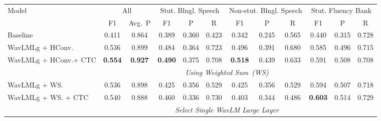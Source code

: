 \begin{table}
\centering
\begin{tabular}{lccccccccccc}
\toprule
\multirow{2}{*}{Model} & \multicolumn{2}{c}{All} &  \multicolumn{3}{c}{Stut. Blngl. Speech} & \multicolumn{3}{c}{Non-stut. Blngl. Speech} &  \multicolumn{3}{c}{Stut. Fluency Bank} \\
\cmidrule(lr){2-3}
\cmidrule(lr){4-6}
\cmidrule(lr){7-9}
\cmidrule(lr){10-12}
   & F1 & Avg.~P & 
 F1	& P & R & 
 F1	& P & R & 
 F1	& P & R \\
\midrule
Baseline~\cite{harvill22_interspeech}& 0.411 & 0.864 &
0.389 &	0.360 &	0.423 &	
0.342 &	0.245 &	0.565 &	
0.440 &	0.315 &	0.728 \\

WavLMLg + HConv. & 
	0.536 & 0.899  &	0.484 &	0.364 &	0.723 &	0.496 &	0.391 &	0.680 &	0.585 &	0.496 &	0.715 \\

WavLMLg + HConv.+ CTC &
	\textbf{0.554} & \textbf{0.927}  &	\textbf{0.490} &	0.375 &	0.708 &	\textbf{0.518} &	0.439 &	0.633 &	0.591 &	0.508 &	0.708 \\

\midrule
 & \multicolumn{10}{c}{\textit{Using Weighted Sum~(WS)}} \\
\cmidrule(lr){2-12}
WavLMLg + WS. &
	0.536 & 0.898 &	0.425 &	0.356 &	0.529 &	0.425 &	0.356 &	0.529 &	0.594 &	0.507 &	0.718 \\


WavLMLg + WS. + CTC &
	0.540 & 0.888 &	0.460 &	0.336 &	0.730 &	0.403 &	0.344 &	0.486 &	\textbf{0.603} &	0.514 &	0.729 \\


\midrule
 & \multicolumn{10}{c}{\textit{Select Single WavLM Large Layer}} \\
\cmidrule(lr){2-12}










\end{tabular}
\end{table}
